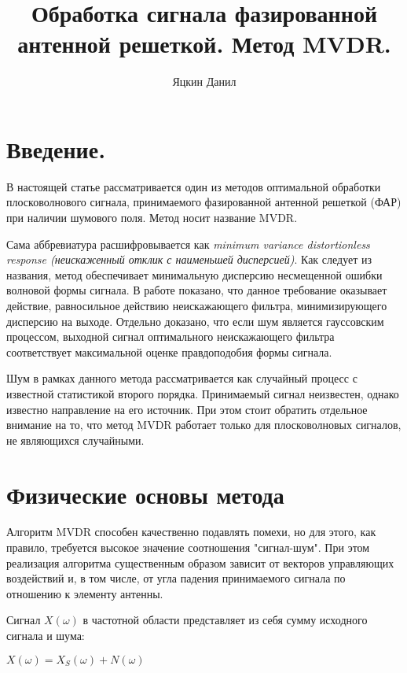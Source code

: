\documentclass{article}
\title{Обработка сигнала фазированной антенной решеткой. Метод MVDR.}
\author{Яцкин Данил}
\begin{document}
\maketitle

\section{Введение.}
 
В настоящей  статье рассматривается один из методов оптимальной обработки плосковолнового сигнала, принимаемого фазированной антенной решеткой (ФАР) при наличии шумового поля. Метод носит название MVDR.
 
Сама аббревиатура расшифровывается как \textit{minimum variance distortionless response (неискаженный отклик с наименьшей дисперсией)}. Как следует из названия, метод обеспечивает минимальную дисперсию несмещенной ошибки  волновой формы сигнала. В работе \cite{Trees2002} показано, что данное требование оказывает действие, равносильное действию неискажающего фильтра, минимизирующего дисперсию на выходе. Отдельно доказано, что если шум является гауссовским процессом, выходной сигнал оптимального неискажающего фильтра соответствует максимальной оценке правдоподобия формы сигнала.

Шум в рамках данного метода рассматривается как случайный процесс с известной статистикой второго порядка. Принимаемый сигнал неизвестен, однако известно направление на его источник. При этом стоит обратить отдельное внимание на то, что метод MVDR работает только для плосковолновых сигналов, не являющихся случайными.






\section{Физические основы метода}

Алгоритм MVDR способен качественно подавлять помехи, но для этого, как правило, требуется высокое значение соотношения "сигнал-шум". При этом реализация алгоритма существенным образом зависит от векторов управляющих воздействий и, в том числе, от угла падения принимаемого сигнала по отношению к элементу антенны.

Сигнал $X(\omega)$ в частотной области представляет из себя сумму исходного сигнала и шума:

\begin{center}
$X(\omega) = X_{S}(\omega) + N(\omega)$
\end{center}
\end{document}
